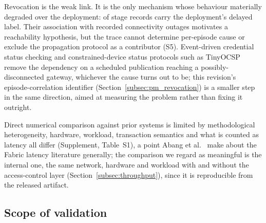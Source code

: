\documentclass[a4paper,fleqn]{cas-sc}
\begin{document}
Revocation is the weak link. It is the only mechanism whose behaviour
materially degraded over the deployment: \RevDelayed{} of \RevEvents{}
stage records carry the deployment's delayed label. Their association with
recorded connectivity outages motivates a reachability hypothesis, but the
trace cannot determine per-episode cause or exclude the propagation
protocol as a contributor (S5). Event-driven credential status checking
\cite{w3c_vc_status_list} and constrained-device status protocols such as
TinyOCSP \cite{fedrecheski2023tinyocsp} remove the dependency on a
scheduled publication reaching a possibly-disconnected gateway, whichever
the cause turns out to be; this revision's episode-correlation identifier
(Section~\ref{subsec:pm_revocation}) is a smaller step in the same
direction, aimed at measuring the problem rather than fixing it outright.

Direct numerical comparison against prior systems is limited by
methodological heterogeneity, hardware, workload, transaction semantics
and what is counted as latency all differ (Supplement, Table~S1), a point
Abang et al.~\cite{abang2024latency} make about the Fabric latency
literature generally; the comparison we regard as meaningful is the
internal one, the same network, hardware and workload with and without
the access-control layer (Section~\ref{subsec:throughput}), since it is
reproducible from the released artifact.

\subsection{Scope of validation}
\label{subsec:notvalidated}
\end{document}
